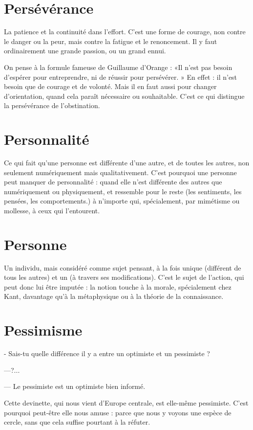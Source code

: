 \section{Persévérance}
La patience et la continuité dans l'effort. C’est une forme
de courage, non contre le danger ou la peur, mais contre
la fatigue et le renoncement. Il y faut ordinairement une grande passion, ou un
grand ennui.

On pense à la formule fameuse de Guillaume d'Orange : «Il n’est pas
besoin d’espérer pour entreprendre, ni de réussir pour persévérer. » En effet : il
n’est besoin que de courage et de volonté. Mais il en faut aussi pour changer
d'orientation, quand cela paraît nécessaire ou souhaitable. C’est ce qui distingue
la persévérance de l’obstination.

\section{Personnalité}
Ce qui fait qu’une personne est différente d’une autre, et
de toutes les autres, non seulement numériquement mais
qualitativement. C’est pourquoi une personne peut manquer de personnalité :
quand elle n’est différente des autres que numériquement ou physiquement, et
ressemble pour le reste (les sentiments, les pensées, les comportements.) à
n'importe qui, spécialement, par mimétisme ou mollesse, à ceux qui l’entourent.

\section{Personne}
Un individu, mais considéré comme sujet pensant, à la fois unique
(différent de tous les autres) et un (à travers ses modifications).
C’est le sujet de l’action, qui peut donc lui être imputée : la notion touche à la
morale, spécialement chez Kant, davantage qu’à la métaphysique ou à la
théorie de la connaissance.

\section{Pessimisme}
- Sais-tu quelle différence il y a entre un optimiste et un pessimiste ?

—?...

— Le pessimiste est un optimiste bien informé.

Cette devinette, qui nous vient d'Europe centrale, est elle-même pessimiste.
C’est pourquoi peut-être elle nous amuse : parce que nous y voyons une espèce
de cercle, sans que cela suffise pourtant à la réfuter.

